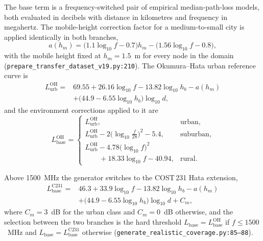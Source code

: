 The base term is a frequency-switched pair of empirical median-path-loss
models, both evaluated in decibels with distance in kilometres and
frequency in megahertz. The mobile-height correction factor for a
medium-to-small city is applied identically in both branches,
\begin{equation}
a(h_{m}) = \bigl(1.1\log_{10} f - 0.7\bigr)h_{m}
         - \bigl(1.56\log_{10} f - 0.8\bigr) ,
\label{eq:app-ahm}
\end{equation}
with the mobile height fixed at $h_{m}=1.5$~m for every node in the domain
(\texttt{prepare\_\allowbreak{}transfer\_\allowbreak{}dataset\_\allowbreak{}v19.py:\allowbreak{}210}). The Okumura--Hata urban
reference curve is
\begin{equation}
\begin{split}
L_{\mathrm{urb}}^{\mathrm{OH}} = {}& 69.55 + 26.16\log_{10} f
   - 13.82\log_{10} h_{b} - a(h_{m}) \\
 & + \bigl(44.9 - 6.55\log_{10} h_{b}\bigr)\log_{10} d ,
\end{split}
\label{eq:app-hata-urban}
\end{equation}
and the environment corrections applied to it are
\begin{equation}
L_{\mathrm{base}}^{\mathrm{OH}} =
\begin{cases}
L_{\mathrm{urb}}^{\mathrm{OH}}, & \text{urban},\\[2pt]
L_{\mathrm{urb}}^{\mathrm{OH}} - 2\bigl(\log_{10}\tfrac{f}{28}\bigr)^{2} - 5.4,
  & \text{suburban},\\[2pt]
L_{\mathrm{urb}}^{\mathrm{OH}} - 4.78\bigl(\log_{10} f\bigr)^{2} & \\
  \qquad {} + 18.33\log_{10} f - 40.94, & \text{rural}.
\end{cases}
\label{eq:app-hata-env}
\end{equation}

Above 1500~MHz the generator switches to the COST\,231 Hata extension,
\begin{equation}
\begin{split}
L_{\mathrm{base}}^{\mathrm{C231}} = {}& 46.3 + 33.9\log_{10} f
   - 13.82\log_{10} h_{b} - a(h_{m}) \\
 & + \bigl(44.9 - 6.55\log_{10} h_{b}\bigr)\log_{10} d + C_{m} ,
\end{split}
\label{eq:app-cost231}
\end{equation}
where $C_{m}=3$~dB for the urban class and $C_{m}=0$~dB otherwise, and the
selection between the two branches is the hard threshold
$L_{\mathrm{base}} = L_{\mathrm{base}}^{\mathrm{OH}}$ if $f\le 1500$~MHz and
$L_{\mathrm{base}} = L_{\mathrm{base}}^{\mathrm{C231}}$ otherwise
(\texttt{generate\_\allowbreak{}realistic\_\allowbreak{}coverage\allowbreak{}.py:\allowbreak{}85--88}).

